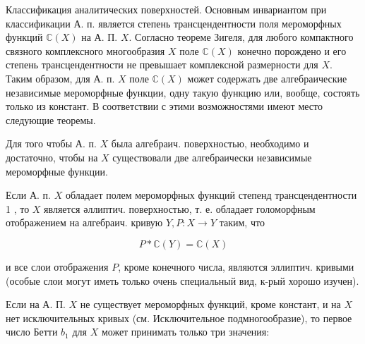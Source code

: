 \documentclass[10pt]{article}
\begin{document}
Классификация аналитических поверхностей. Основным инвариантом при классификации А. п. является степень трансцендентности поля мероморфных функций $\mathbb{C}(X)$ на А. П. $X$. Согласно теореме Зигеля, для любого компактного связного комплексного многообразия $X$ поле $\mathbb{C}(X)$ конечно порождено и его степень трансцендентности не превышает комплексной размерности для $X$. Таким образом, для А. п. $X$ поле $\mathbb{C}(X)$ может содержать две алгебраические независимые мероморфные функции, одну такую функцию или, вообще, состоять только из констант. В соответствии с этими возможностями имеют место следующие теоремы.



Для того чтобы А. п. $X$ была алгебраич. поверхностью, необходимо и достаточно, чтобы на $X$ существовали две алгебраически независимые мероморфные функции.



Если А. п. $X$ обладает полем мероморфных функций степенд трансцендентности 1 , то $X$ является әллиптич. поверхностью, т. е. обладает голоморфным отображением на алгебраич. кривую $Y, P: X \rightarrow Y$ таким, что



\[

P * \mathbb{C}(Y)=\mathbb{C}(X)

\]



и все слои отображения $P$, кроме конечного числа, являются эллиптич. кривыми (особые слои могут иметь только очень специальный вид, к-рый хорошо изучен).



Если на А. П. $X$ не существует мероморфных функций, кроме констант, и на $X$ нет исключительных кривых (см. Исключительное подмногообразие), то первое число Бетти $b_{1}$ для $X$ может принимать только три значения:
\end{document}
